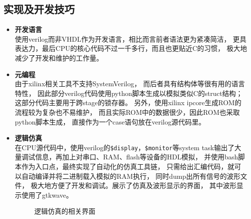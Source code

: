 \subsection{实现及开发技巧}
\begin{itemize}
	\item {\bf 开发语言}  \\
		使用verilog而非VHDL作为开发语言，相比而言前者语法更为紧凑简洁，
		更具表达力，最后CPU的核心代码不过一千多行，而且也更贴近C的习惯，
		极大地减少了开发和维护的工作量。
	\item {\bf 元编程} \\
		由于xilinx相关工具不支持SystemVerilog，
		而后者具有结构体等很有用的语言特性，
		因此部分verilog代码使用python脚本生成以模拟类似C的struct结构；
		这部分代码主要用于跨stage的锁存器。
		另外，使用xilinx ipcore生成ROM的流程较为复杂也不易维护，
		而且实际ROM中的数据很少，因此ROM也采取python脚本生成，
		直接作为一个case语句放在verilog源代码里。
	\item {\bf 逻辑仿真} \\
		在CPU源代码中，使用verilog的\verb|$display|，\verb|$monitor|等system
		task输出了大量调试信息，再加上对串口、RAM、flash等设备的HDL模拟，
		并使用bash脚本作为入口点，最终实现了自动化的仿真工具链，
		只需给出汇编代码，就可以自动编译并将二进制载入模拟的RAM执行，
		同时dump出所有信号的波形文件，
		极大地方便了开发和调试。展示了仿真及波形显示的界面，
		其中波形显示使用了gtkwave。
		\begin{figure}[!ht]
			\caption{\label{fig:simulate}逻辑仿真的相关界面}
		\end{figure}
\end{itemize}


